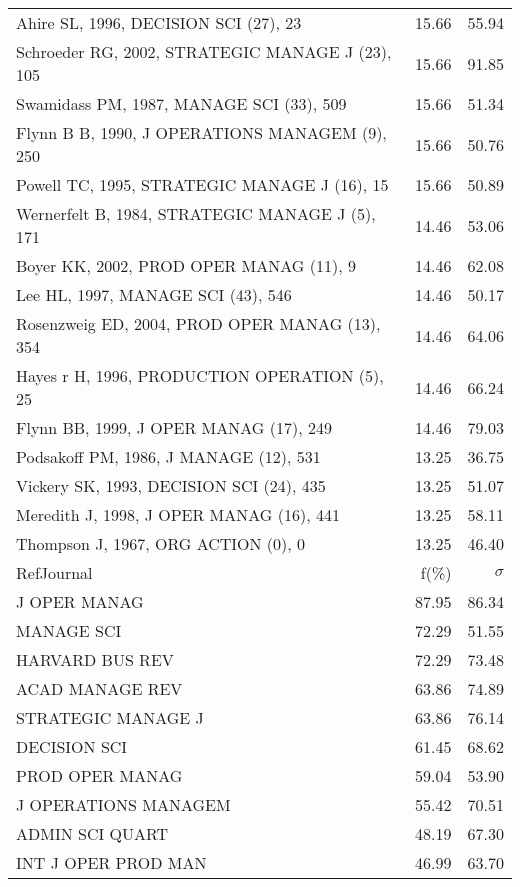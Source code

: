 \documentclass[a4paper,11pt]{report}
\begin{document}
\begin{landscape}
\begin{table}[!ht]
{\begin{tabular}{|l r r|}
Ahire SL, 1996, DECISION SCI (27), 23 & 15.66 & 55.94\\
Schroeder RG, 2002, STRATEGIC MANAGE J (23), 105 & 15.66 & 91.85\\
Swamidass PM, 1987, MANAGE SCI (33), 509 & 15.66 & 51.34\\
Flynn B B, 1990, J OPERATIONS MANAGEM (9), 250 & 15.66 & 50.76\\
Powell TC, 1995, STRATEGIC MANAGE J (16), 15 & 15.66 & 50.89\\
Wernerfelt B, 1984, STRATEGIC MANAGE J (5), 171 & 14.46 & 53.06\\
Boyer KK, 2002, PROD OPER MANAG (11), 9 & 14.46 & 62.08\\
Lee HL, 1997, MANAGE SCI (43), 546 & 14.46 & 50.17\\
Rosenzweig ED, 2004, PROD OPER MANAG (13), 354 & 14.46 & 64.06\\
Hayes r H, 1996, PRODUCTION OPERATION (5), 25 & 14.46 & 66.24\\
Flynn BB, 1999, J OPER MANAG (17), 249 & 14.46 & 79.03\\
Podsakoff PM, 1986, J MANAGE (12), 531 & 13.25 & 36.75\\
Vickery SK, 1993, DECISION SCI (24), 435 & 13.25 & 51.07\\
Meredith J, 1998, J OPER MANAG (16), 441 & 13.25 & 58.11\\
Thompson J, 1967, ORG ACTION (0), 0 & 13.25 & 46.40\\
\hline
\hline
RefJournal & f(\%) & $\sigma$\\
\hline
J OPER MANAG & 87.95 & 86.34\\
MANAGE SCI & 72.29 & 51.55\\
HARVARD BUS REV & 72.29 & 73.48\\
ACAD MANAGE REV & 63.86 & 74.89\\
STRATEGIC MANAGE J & 63.86 & 76.14\\
DECISION SCI & 61.45 & 68.62\\
PROD OPER MANAG & 59.04 & 53.90\\
J OPERATIONS MANAGEM & 55.42 & 70.51\\
ADMIN SCI QUART & 48.19 & 67.30\\
INT J OPER PROD MAN & 46.99 & 63.70\\
\hline
\end{tabular}
}
\end{table}

\clearpage


\end{landscape}
\end{document}
